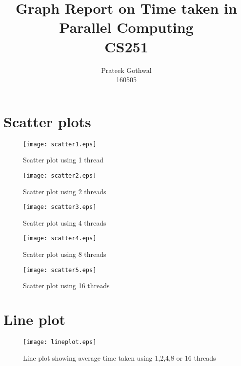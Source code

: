 \documentclass[a4paper, 10pt]{report}
\title{Graph Report on Time taken in Parallel Computing\\CS251}
\author{Prateek Gothwal\\160505}
\begin{document}
\maketitle

\chapter{Scatter plots}

\begin{figure}
\centering
\texttt{[image: scatter1.eps]}
 \caption{Scatter plot using 1 thread}
\end{figure}

\begin{figure}
\centering
\texttt{[image: scatter2.eps]}
 \caption{Scatter plot using 2 threads}
 \label{fig:cc_get}
\end{figure}

\begin{figure}
\centering
\texttt{[image: scatter3.eps]}
 \caption{Scatter plot using 4 threads}
\end{figure}

\begin{figure}
\centering
\texttt{[image: scatter4.eps]}
 \caption{Scatter plot using 8 threads}
 \label{fig:cc_get}
\end{figure}

\begin{figure}
\centering
\texttt{[image: scatter5.eps]}
 \caption{Scatter plot using 16 threads}
\end{figure}

\chapter{Line plot}

\begin{figure}
\centering
\texttt{[image: lineplot.eps]}
 \caption{Line plot showing average time taken using 1,2,4,8 or 16 threads}
\end{figure}



\end{document}

